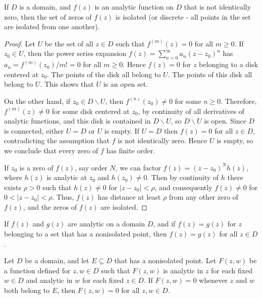 \begin{theorem}
    If $D$ is a domain, and $f(z)$ is an analytic function on $D$ that is not identically zero, then the set of zeros of $f(z)$ is isolated (or discrete - all points in the set are isolated from one another).
\end{theorem}
\begin{proof}
    Let $U$ be the set of all $z \in D$ such that $f^{(m)}(z) = 0$ for all $m \geq 0$. If $z_0 \in U$, then the power series expansion $f(z) = \sum_{n=0}^{\infty}a_n(z-z_0)^n$ has $a_n = f^{(m)}(z_0)/m! = 0$ for all $m \geq 0$. Hence $f(z) = 0$ for $z$ belonging to a disk centered at $z_0$. The points of the disk all belong to $U$. The points of this disk all belong to $U$. This shows that $U$ is an open set.

    On the other hand, if $z_0 \in D\backslash U$, then $f^{(n)}(z_0) \neq 0$ for some $n \geq 0$. Therefore, $f^{(m)}(z) \neq 0$ for some disk centered at $z_0$, by continuity of all derivatives of analytic functions, and this disk is contained in $D\backslash U$, so $D\backslash U$ is open. Since $D$ is connected, either $U = D$ or $U$ is empty. If $U = D$ then $f(z) = 0$ for all $z \in D$, contradicting the assumption that $f$ is not identically zero. Hence $U$ is empty, so we conclude that every zero of $f$ has finite order.

    If $z_0$ is a zero of $f(z)$, say order $N$, we can factor $f(z) = (z-z_0)^Nh(z)$, where $h(z)$ is analytic at $z_0$ and $h(z_0) \neq 0$. Then by continuity of $h$ there exists $\rho > 0$ such that $h(z) \neq 0$ for $|z-z_0| < \rho$, and consequently $f(z) \neq 0$ for $0 < |z-z_0| < \rho$. Thus, $f(z)$ has distance at least $\rho$ from any other zero of $f(z)$, and the zeros of $f(z)$ are isolated.
\end{proof}



\begin{theorem}
    If $f(z)$ and $g(z)$ are analytic on a domain $D$, and if $f(z) = g(z)$ for $z$ belonging to a set that has a nonisolated point, then $f(z) = g(z)$ for all $z \in D$.
\end{theorem}


\begin{theorem}
    Let $D$ be a domain, and let $E \subseteq D$ that has a nonisolated point. Let $F(z,w)$ be a function defined for $z,w \in D$ such that $F(z,w)$ is analytic in $z$ for each fixed $w \in D$ and analytic in $w$ for each fixed $z \in D$. If $F(z,w) = 0$ whenever $z$ and $w$ both belong to $E$, then $F(z,w) = 0$ for all $z,w \in D$.
\end{theorem}



